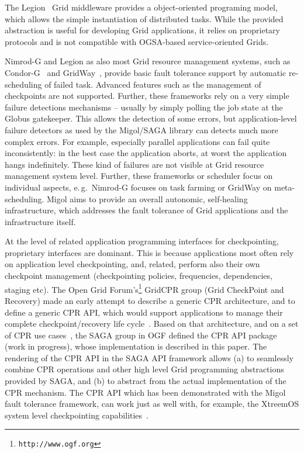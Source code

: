 \documentclass[times, 10pt,twocolumn]{article}
\begin{document}
The Legion~\cite{689541} Grid middleware provides a object-oriented
programing model, which allows the simple instantiation of distributed
tasks. While the provided abstraction is useful for developing Grid
applications, it relies on proprietary protocols and is not compatible
with OGSA-based service-oriented Grids.

Nimrod-G and Legion as also most Grid resource management systems,
such as Condor-G~\cite{citeulike:291860} and GridWay~\cite{Montero05},
provide basic fault tolerance support by automatic re-scheduling of
failed task. Advanced features such as the management of checkpoints
are not supported. Further, these frameworks rely on a very simple
failure detections mechanisms -- usually by simply polling the job
state at the Globus gatekeeper. This allows the detection of some
errors, but application-level failure detectors as used by the
Migol/SAGA library can detects much more complex errors. For example,
especially parallel applications can fail quite inconsistently: in the
best case the application aborts, at worst the application hangs
indefinitely. These kind of failures are not visible at Grid resource
management system level. Further, these frameworks or scheduler focus
on individual aspects, e.\,g.\ Nimrod-G focuses on task farming or
GridWay on meta-scheduling. Migol aims to provide an overall
autonomic, self-healing infrastructure, which addresses the fault
tolerance of Grid applications and the infrastructure itself.

At the level of related application programming interfaces for
checkpointing, proprietary interfaces are dominant. This is because
applications most often rely on application level checkpointing, and,
related, perform also their own checkpoint management (checkpointing
policies, frequencies, dependencies, staging etc).  The Open Grid
Forum's\footnote{\texttt{http://www.ogf.org}} GridCPR group (Grid
CheckPoint and Recovery) made an early attempt to describe a generic
CPR architecture, and to define a generic CPR API, which would support
applications to manage their complete checkpoint/recovery life
cycle~\cite{ogf_cpr_arch}.  Based on that architecture, and on a set
of CPR use cases~\cite{ogf_cpr_uc}, the SAGA group in OGF defined the
CPR API package~\cite{ogf_cpr_draft} (work in progress), whose
implementation is described in this paper.  The rendering of the CPR
API in the SAGA API framework allows (a) to seamlessly combine CPR
operations and other high level Grid programming abstractions provided
by SAGA, and (b) to abstract from the actual implementation of the CPR
mechanism.  The CPR API which has been demonstrated with the Migol
fault tolerance framework, can work just as well with, for example,
the XtreemOS system level checkpointing
capabilities~\cite{xtreemos_cpr}.
\end{document}
